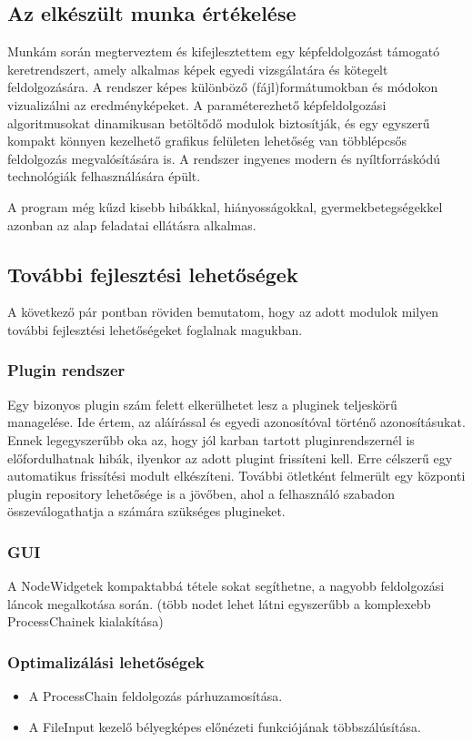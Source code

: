 \documentclass[a4paper,12pt,oneside]{report}
\begin{document}
\subsection{Az elkészült munka értékelése}

Munkám során megterveztem és kifejlesztettem egy képfeldolgozást támogató keretrendszert, amely alkalmas képek egyedi vizsgálatára és kötegelt feldolgozására. A rendszer képes különböző (fájl)formátumokban és módokon vizualizálni az eredményképeket. A paraméterezhető képfeldolgozási algoritmusokat dinamikusan betöltődő modulok biztosítják, és egy egyszerű kompakt könnyen kezelhető grafikus felületen lehetőség van többlépcsős feldolgozás megvalósítására is. A rendszer ingyenes modern és nyíltforráskódú technológiák felhasználására épült.

A program még kűzd kisebb hibákkal, hiányosságokkal, gyermekbetegségekkel azonban az alap feladatai ellátásra alkalmas. 

\subsection{További fejlesztési lehetőségek}
A következő pár pontban röviden bemutatom, hogy az adott modulok milyen további fejlesztési lehetőségeket foglalnak magukban.
\subsubsection{Plugin rendszer}
Egy bizonyos plugin szám felett elkerülhetet lesz a pluginek teljeskörű managelése. Ide értem, az aláírással és egyedi azonosítóval történő azonosításukat. Ennek legegyszerűbb oka az, hogy jól karban tartott pluginrendszernél is előfordulhatnak hibák, ilyenkor az adott plugint frissíteni kell. Erre célszerű egy automatikus frissítési modult elkészíteni. További ötletként felmerült egy központi plugin repository lehetősége is a jövőben, ahol a felhasználó szabadon összeválogathatja a számára szükséges plugineket.
\subsubsection{GUI}
A NodeWidgetek kompaktabbá tétele sokat segíthetne, a nagyobb feldolgozási láncok megalkotása során. (több nodet lehet látni egyszerűbb a komplexebb ProcessChainek kialakítása)
\subsubsection{Optimalizálási lehetőségek}
\begin{itemize}
	\itemsep0em
	\item A ProcessChain feldolgozás párhuzamosítása.
	\item  A FileInput kezelő bélyegképes előnézeti funkciójának többszálúsítása.
\end{itemize}
\end{document}
